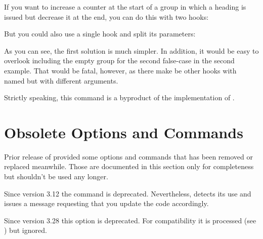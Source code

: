 \begin{Example}
  If you want to increase a counter at the start of a group in which a heading
  is issued but decrease it at the end, you can do this with two hooks:
\begin{lstcode}
              {\stepCounter}
  \newcommand*{\restepCounter}[1]{%
    \addtocounter{#1Counter}{-1}%
  }
              {\restepCounter}
\end{lstcode}
  But you could also use a single hook and split its parameters:
\begin{lstcode}
  \newcommand*{\changeCounter}[1]{%
    \SplitDoHook{#1}{\Group}{\Level}%
    \Ifstr{\Group}{begingroup}{%
      \stepcounter{\Level Counter}%
    }{%
      \Ifstr{\Group}{endgroup}{%
        \addtocounter{\Level Counter}{-1}%
      }{}%
    }%
  }
              {\changeCounter}
\end{lstcode}
  As you can see, the first solution is much simpler. In addition, it would
  be easy to overlook including the empty group for the second false-case in
  the second example. That would be fatal, however, as there make be other
  hooks with named  but with different arguments.
\end{Example}

Strictly speaking, this command is a byproduct of the implementation of
.%
\EndIndexGroup
%
\EndIndexGroup

\section{Obsolete Options and Commands}

Prior release of  provided some options and commands that has
been removed or replaced meanwhile. Those are documented in this section only
for completeness but shouldn't be used any longer.

\begin{Explain}
  \begin{Declaration}
  \end{Declaration}
  Since version 3.12 the command is deprecated.  Nevertheless,
   detects its use and issues a message requesting that you
  update the code accordingly.%
  \EndIndexGroup%


  \begin{Declaration}
  \end{Declaration}
  Since version 3.28 this option is deprecated. For compatibility it is
  processed (see ) but
  ignored.%
  \EndIndexGroup%
\end{Explain}%
%
\EndIndexGroup

\endinput

